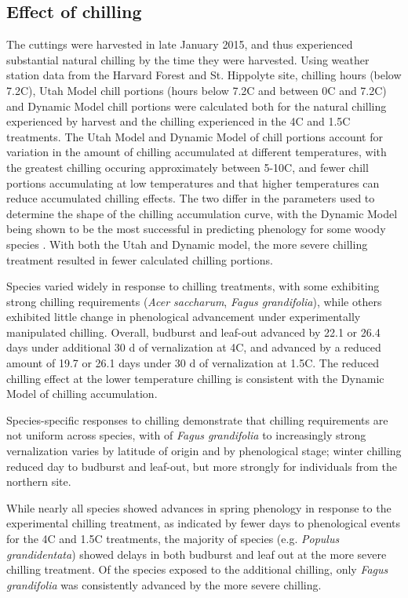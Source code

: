 \documentclass[12pt]{article}
\begin{document}
\subsection*{Effect of chilling}
The cuttings were harvested in late January 2015, and thus experienced substantial natural chilling by the time they were harvested. Using weather station data from the Harvard Forest and St. Hippolyte site, chilling hours (below 7.2\degree C), Utah Model chill portions (hours below 7.2\degree C and between 0\degree C and 7.2\degree C) and Dynamic Model \cite{Erez:1988} chill portions were calculated both for the natural chilling experienced by harvest and the chilling experienced in the 4\degree C and 1.5\degree C treatments. The Utah Model and Dynamic Model of chill portions account for variation in the amount of chilling accumulated at different temperatures, with the greatest chilling occuring approximately between 5-10\degree C, and fewer chill portions accumulating at low temperatures and that higher temperatures can reduce accumulated chilling effects. The two differ in the parameters used to determine the shape of the chilling accumulation curve, with the Dynamic Model being shown to be the most successful in predicting phenology for some woody species \cite{Luedeling:2009}.
With both the Utah and Dynamic model, the more severe chilling treatment resulted in fewer calculated chilling portions. 

Species varied widely in response to chilling treatments, with some exhibiting strong chilling requirements (\emph{Acer saccharum}, \emph{Fagus grandifolia}), while others exhibited little change in phenological advancement under experimentally manipulated chilling. Overall, budburst and leaf-out advanced by 22.1 or 26.4 days under additional 30 d of vernalization at 4\degree C, and advanced by a reduced amount of 19.7 or 26.1 days under 30 d of vernalization at 1.5\degree C. The reduced chilling effect at the lower temperature chilling is consistent with the Dynamic Model of chilling accumulation. %

Species-specific responses to chilling demonstrate that chilling requirements are not uniform across species, with 
of \emph{Fagus grandifolia} to increasingly strong vernalization varies by latitude of origin and by phenological stage; winter chilling reduced day to budburst and leaf-out, but more strongly for individuals from the northern site.

While nearly all species showed advances in spring phenology in response to the experimental chilling treatment, as indicated by fewer days to phenological events for the 4\degree C and 1.5\degree C treatments, the majority of species (e.g. \emph{Populus grandidentata}) showed delays in both budburst and leaf out at the more severe chilling treatment. Of the species exposed to the additional chilling, only \emph{Fagus grandifolia} was consistently advanced by the more severe chilling.
\end{document}
